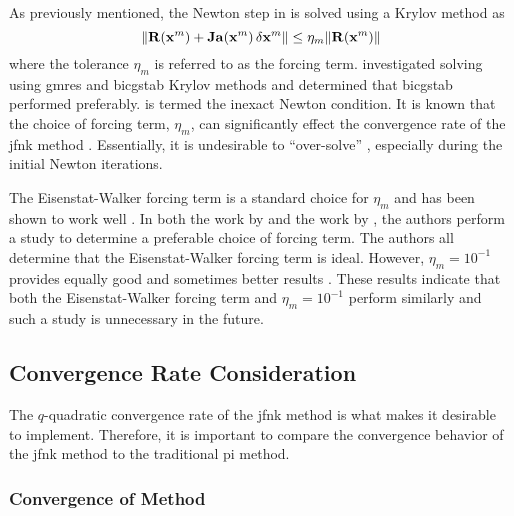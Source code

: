     As previously mentioned, the Newton step in  is solved
    using a Krylov method as
    \begin{equation}
      \label{eq:inexact_newton_condition}
      \| \mathbf{R}(\mathbf{x}^m) + \mathbf{Ja}(\mathbf{x}^m) \, \delta\mathbf{x}^m \| \le 
        \eta_m \| \mathbf{R}(\mathbf{x}^m) \|
    \end{equation}
    where the tolerance $\eta_m$ is referred to as the forcing term.
    \citeauthor{qe2paper} investigated solving
     using \gls{gmres} and \gls{bicgstab}
    Krylov methods and determined that \gls{bicgstab} performed preferably.
     is termed the inexact Newton condition.
    It is known that the choice of forcing term, $\eta_m$, can significantly
    effect the convergence rate of the \gls{jfnk} method \cite{textbookkelley}.
    Essentially, it is undesirable to ``over-solve''
    , especially during the initial Newton
    iterations.

    The Eisenstat-Walker forcing term is a standard choice for $\eta_m$ and has
    been shown to work well \cite{qe2paper,gill_azmy}. In both the work by
    \citeauthor{qe2paper} and the work by \citeauthor{gill_azmy}, the authors
    perform a study to determine a preferable choice of forcing term. The
    authors all determine that the Eisenstat-Walker forcing term is ideal.
    However, $\eta_m = 10^{-1}$ provides equally good and sometimes better
    results \cite{qe2paper,gill_azmy,jfnk_wielandt,ma784notes}. These results 
    indicate that both the Eisenstat-Walker forcing term and $\eta_m = 10^{-1}$
    perform similarly and such a study is unnecessary in the future.

  \subsection{Convergence Rate Consideration}

    The $q$-quadratic convergence rate of the \gls{jfnk} method is what makes it
    desirable to implement. Therefore, it is important to compare the
    convergence behavior of the \gls{jfnk} method to the traditional \gls{pi}
    method.

    \subsubsection{Convergence of  Method}
      \label{sec:dominance_ratio}

